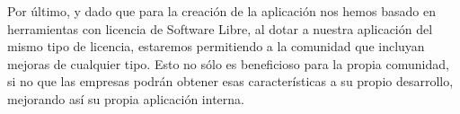 \documentclass{\ClassPath/viu-tfm-template}
\begin{document}
Por último, y dado que para la creación de la aplicación nos hemos basado en herramientas con licencia de Software Libre, al dotar a nuestra aplicación del mismo tipo de licencia, estaremos permitiendo a la comunidad que incluyan mejoras de cualquier tipo. Esto no sólo es beneficioso para la propia comunidad, si no que las empresas podrán obtener esas características a su propio desarrollo, mejorando así su propia aplicación interna.




\vfill

\pagebreak
\printbibliography[title={Referencias bibliográficas},heading=bibintoc]
\pagebreak

{
    \hypersetup{linkcolor = black}
    \listoffigures
}
\end{document}
